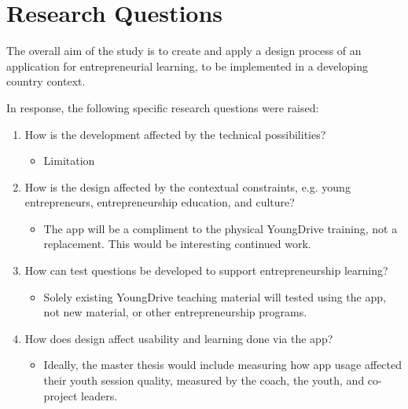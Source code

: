 \section{Research Questions}

The overall aim of the study is to create and apply a design process of an application for entrepreneurial learning, to be implemented in a developing country context.

In response, the following specific research questions were raised:

\begin{enumerate}
    \item How is the development affected by the technical possibilities?
    \begin{itemize}
    \item Limitation 
    \end{itemize}

    \item How is the design affected by the contextual  constraints, e.g. young entrepreneurs, entrepreneurship education, and culture? %
    \begin{itemize}
        \item The app will be a compliment to the physical YoungDrive training, not a replacement. This would be interesting continued work.
    \end{itemize}


    \item How can test questions be developed to support entrepreneurship learning? %
    \begin{itemize}
        \item Solely existing YoungDrive teaching material will tested using the app, not new material, or other entrepreneurship programs.
    \end{itemize}

    \item How does design affect usability and learning done via the app? %
    \begin{itemize}
        \item Ideally, the master thesis would include measuring how app usage affected their youth session quality, measured by the coach, the youth, and co-project leaders.


\end{itemize}
\end{enumerate}
